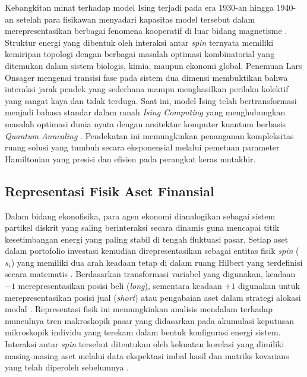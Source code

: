 Kebangkitan minat terhadap model Ising terjadi pada era 1930-an hingga 1940-an setelah para fisikawan menyadari kapasitas model tersebut dalam merepresentasikan berbagai fenomena kooperatif di luar bidang magnetisme \cite{niss_history_2005}. Struktur energi yang dibentuk oleh interaksi antar \textit{spin} ternyata memiliki kemiripan topologi dengan berbagai masalah optimasi kombinatorial yang ditemukan dalam sistem biologis, kimia, maupun ekonomi global. Penemuan Lars Onsager mengenai transisi fase pada sistem dua dimensi membuktikan bahwa interaksi jarak pendek yang sederhana mampu menghasilkan perilaku kolektif yang sangat kaya dan tidak terduga. Saat ini, model Ising telah bertransformasi menjadi bahasa standar dalam ranah \textit{Ising Computing} yang menghubungkan masalah optimasi dunia nyata dengan arsitektur komputer kuantum berbasis \textit{Quantum Annealing} \cite{lucas_ising_2014}. Pendekatan ini memungkinkan penanganan kompleksitas ruang solusi yang tumbuh secara eksponensial melalui pemetaan parameter Hamiltonian yang presisi dan efisien pada perangkat keras mutakhir.

\subsection{Representasi Fisik Aset Finansial}
Dalam bidang ekonofisika, para agen ekonomi dianalogikan sebagai sistem partikel diskrit yang saling berinteraksi secara dinamis guna mencapai titik kesetimbangan energi yang paling stabil di tengah fluktuasi pasar. Setiap aset dalam portofolio investasi kemudian direpresentasikan sebagai entitas fisik \textit{spin} ($s_i$) yang memiliki dua arah keadaan tetap di dalam ruang Hilbert yang terdefinisi secara matematis \cite{galam_ising_2010}. Berdasarkan transformasi variabel yang digunakan, keadaan $-1$ merepresentasikan posisi beli (\textit{long}), sementara keadaan $+1$ digunakan untuk merepresentasikan posisi jual (\textit{short}) atau pengabaian aset dalam strategi alokasi modal \cite{lucas_ising_2014}. Representasi fisik ini memungkinkan analisis mendalam terhadap munculnya tren makroskopik pasar yang didasarkan pada akumulasi keputusan mikroskopik individu yang terekam dalam bentuk konfigurasi energi sistem. Interaksi antar \textit{spin} tersebut ditentukan oleh kekuatan korelasi yang dimiliki masing-masing aset melalui data ekspektasi imbal hasil dan matriks kovarians yang telah diperoleh sebelumnya \cite{hidalgo_quantum_2006}.

